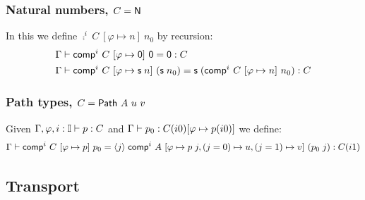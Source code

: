 \subsubsection*{Natural numbers, $C = \hbox{\sf N}$}

In this we define $\comp^i~C~[\varphi\mapsto n]~n_0$ by recursion:
%
\begin{align*}
  &\Gamma \vdash {\sf comp}^i~C~[ \varphi \mapsto {\sf 0} ]~{\sf 0} = {\sf 0} : C
  \\
  &\Gamma \vdash {\sf comp}^i~C~[ \varphi \mapsto {\sf s} \; n ]~({\sf s} \; n_0) =
  {\sf s} \; ({\sf comp}^i~C~[ \varphi \mapsto n ]~n_0) : C
\end{align*}

\subsubsection*{Path types, $C = {\sf Path}~A~u~v$}

Given $\Gamma, \varphi , i : \mathbb{I}\vdash p : C$ and $\Gamma \vdash p_0 :
C(i0)[ \varphi \mapsto p(i0) ]$ we define:
%
\[
\Gamma \vdash {\sf comp}^i~C~[ \varphi \mapsto p]~p_0 = {\langle}j{\rangle} \; {\sf comp}^i~A~[
\varphi \mapsto p \; j, (j=0) \mapsto u, (j=1) \mapsto v ]~(p_0 \; j)
: C(i1)
\]






\subsection{Transport}

